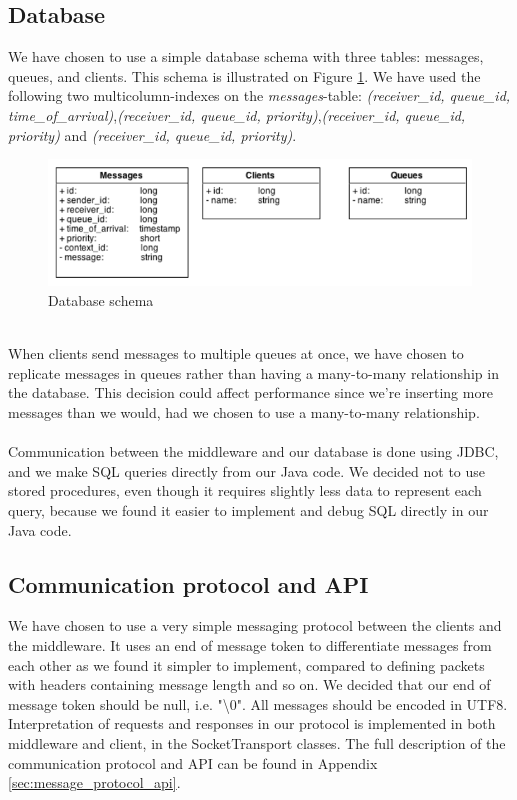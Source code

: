\documentclass{article}
\begin{document}
        \subsection{Database}
            We have chosen to use a simple database schema with three tables: messages, queues, and clients. This schema is illustrated on Figure \ref{fig:database_schema}. We have used the following two multicolumn-indexes on the \textit{messages}-table: \textit{(receiver\_id, queue\_id, time\_of\_arrival)},\textit{(receiver\_id, queue\_id, priority)},\textit{(receiver\_id, queue\_id, priority)} and \textit{(receiver\_id, queue\_id, priority)}. 
            \begin{figure}[H]
                \centering
                \centerline{\includegraphics[scale=0.50]{database_schema}}
                \caption{Database schema}
                \label{fig:database_schema}
            \end{figure}
            ~\\
            When clients send messages to multiple queues at once, we have chosen to replicate messages in queues rather than having a many-to-many relationship in the database. This decision could affect performance since we're inserting more messages than we would, had we chosen to use a many-to-many relationship.\\
            \\
            Communication between the middleware and our database is done using JDBC, and we make SQL queries directly from our Java code. We decided not to use stored procedures, even though it requires slightly less data to represent each query, because we found it easier to implement and debug SQL directly in our Java code.

        \subsection{Communication protocol and API}
            We have chosen to use a very simple messaging protocol between the clients and the middleware. It uses an end of message token to differentiate messages from each other as we found it simpler to implement, compared to defining packets with headers containing message length and so on. We decided that our end of message token should be null, i.e. "\textbackslash0". All messages should be encoded in UTF8.\\
            Interpretation of requests and responses in our protocol is implemented in both middleware and client, in the SocketTransport classes. The full description of the communication protocol and API can be found in Appendix \ref{sec:message_protocol_api}.
\end{document}
